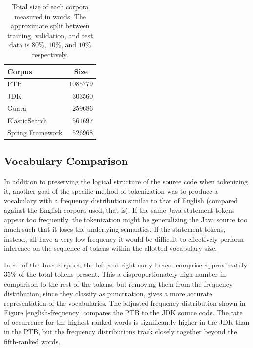 \documentclass[runningheads,a4paper]{llncs}
\begin{document}
\begin{table}[t]
    \caption{Total size of each corpora measured in words. The approximate
    split between training, validation, and test data is $80\%$, $10\%$,
    and $10\%$ respectively.}
    \label{size-table}
    \vskip 0.15in
    \begin{center}
    \begin{tabular}{lr}
    \hline
    Corpus & \multicolumn{1}{c}{Size} \\
    \hline
    PTB                 & $1085779$ \\
    JDK                 & $303560$ \\
    Guava               & $259686$ \\
    ElasticSearch       & $561697$ \\
    Spring Framework    & $526968$ \\
    \hline
    \end{tabular}
    \end{center}
    \vskip -0.1in
\end{table}


\subsection{Vocabulary Comparison}

In addition to preserving the logical structure of the source code when
tokenizing it, another goal of the specific method of tokenization was to
produce a vocabulary with a frequency distribution similar to that of
English (compared against the English corpora used, that is). If the same
Java statement tokens appear too frequently, the tokenization might be
generalizing the Java source too much such that it loses the underlying
semantics. If the statement tokens, instead, all have a very low frequency
it would be difficult to effectively perform inference on the sequence of 
tokens within the allotted vocabulary size.

In all of the Java corpora, the left and right curly braces comprise
approximately $35\%$
of the total tokens present. This a disproportionately high number in
comparison to the rest of the tokens, but removing them from the frequency
distribution, since they classify as punctuation, gives a more accurate
representation of the vocabularies. The adjusted frequency distribution
shown in Figure \ref{english-frequency} compares the PTB to the
JDK source code. The rate of occurrence for the highest
ranked words is significantly higher in the JDK than in the PTB, but
the frequency distributions track closely together beyond the fifth-ranked
words.
\end{document}

